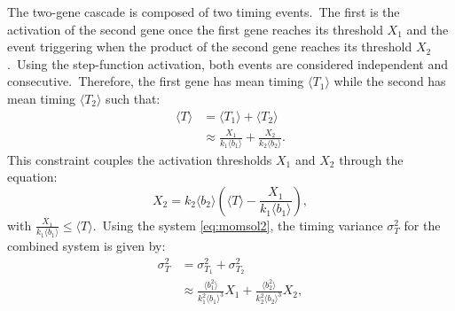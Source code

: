 \documentclass[aps,prb,reprint,superscriptaddress]{revtex4-2}
\begin{document}
The two-gene cascade is composed of two timing events.~The first is the activation of the second gene once the first gene reaches its threshold $X_1$ and the event triggering when the product of the second gene reaches its threshold $X_2$.~Using the step-function activation, both events are considered independent and consecutive.~Therefore, the first gene has mean timing $\langle T_1\rangle$ while the second has mean timing $\langle T_2\rangle$ such that:
\begin{subequations}\label{eq:app4}
    \begin{align}
        \langle T\rangle&=\langle T_1\rangle+\langle T_2\rangle\\
        &\approx\frac{X_1}{k_1\langle b_1\rangle}+\frac{X_2}{k_2\langle b_2\rangle}.
    \end{align}
\end{subequations}
This constraint couples the activation thresholds $X_1$ and $X_2$ through the equation:
\begin{equation}\label{eq:x2}
    X_2=k_2\langle b_2\rangle\left(\langle T\rangle-\frac{X_1}{k_1\langle b_1\rangle}\right),
\end{equation}
with $\frac{X_1}{k_1\langle b_1\rangle}\leq\langle T\rangle$.~Using the system \eqref{eq:momsol2}, the timing variance $\sigma^2_T$ for the combined system is given by:
\begin{subequations}\label{eq:app6}
\begin{align}
\sigma^2_T&=\sigma^2_{T_1}+\sigma^2_{T_2}\\
         &\approx\frac{\langle b^2_1\rangle}{k_1^2\langle b_1\rangle^3}X_1+\frac{\langle b^2_2\rangle}{k_2^2\langle b_2\rangle^3}X_2,   
\end{align}
\end{subequations}
\end{document}
